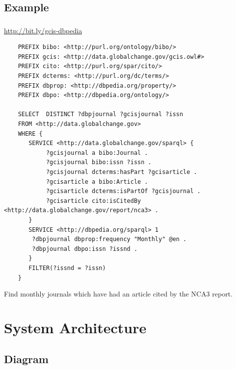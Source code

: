 \documentclass{beamer}
\begin{document}
\subsection{Example}
\begin{frame}[fragile]
    \frametitle{\insertsubsectionhead}
     \url{http://bit.ly/gcis-dbpedia}\\
\begin{tiny}
\begin{Verbatim}
    PREFIX bibo: <http://purl.org/ontology/bibo/>
    PREFIX gcis: <http://data.globalchange.gov/gcis.owl#>
    PREFIX cito: <http://purl.org/spar/cito/>
    PREFIX dcterms: <http://purl.org/dc/terms/>
    PREFIX dbprop: <http://dbpedia.org/property/>
    PREFIX dbpo: <http://dbpedia.org/ontology/>

    SELECT  DISTINCT ?dbpjournal ?gcisjournal ?issn
    FROM <http://data.globalchange.gov>
    WHERE {
       SERVICE <http://data.globalchange.gov/sparql> {
            ?gcisjournal a bibo:Journal .
            ?gcisjournal bibo:issn ?issn .
            ?gcisjournal dcterms:hasPart ?gcisarticle .
            ?gcisarticle a bibo:Article .
            ?gcisarticle dcterms:isPartOf ?gcisjournal .
            ?gcisarticle cito:isCitedBy <http://data.globalchange.gov/report/nca3> .
       }
       SERVICE <http://dbpedia.org/sparql> 1
        ?dbpjournal dbprop:frequency "Monthly" @en .
        ?dbpjournal dbpo:issn ?issnd .
       }
       FILTER(?issnd = ?issn)
    }
\end{Verbatim}
\end{tiny}
    Find monthly journals which have had an article cited by the NCA3 report.

\end{frame}

\section{System Architecture}

\subsection{Diagram}

\end{document}
